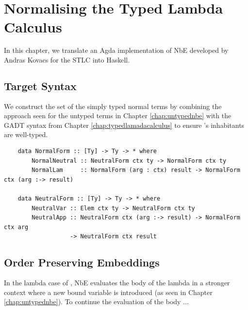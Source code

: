 \chapter{Normalising the Typed Lambda Calculus}
\label{chap:typednbe}

In this chapter, we translate an Agda implementation of NbE developed by Andras Kovacs \cite{AgdaNbe} for the STLC into Haskell.

\section{Target Syntax}


We construct the set of the simply typed normal terms  by combining the approach seen for the untyped terms in Chapter \ref{chap:untypednbe} with the GADT syntax from Chapter \ref{chap:typedlamadacalculus} to ensure 's inhabitants are well-typed.

\begin{lstlisting}
    data NormalForm :: [Ty] -> Ty -> * where
        NormalNeutral :: NeutralForm ctx ty -> NormalForm ctx ty
        NormalLam     :: NormalForm (arg : ctx) result -> NormalForm ctx (arg :-> result)    

    data NeutralForm :: [Ty] -> Ty -> * where
        NeutralVar :: Elem ctx ty -> NeutralForm ctx ty
        NeutralApp :: NeutralForm ctx (arg :-> result) -> NormalForm ctx arg 
                   -> NeutralForm ctx result

\end{lstlisting}






\section{Order Preserving Embeddings}

In the lambda case of , NbE evaluates the body of the lambda in a stronger context where a new bound variable is introduced (as seen in Chapter \ref{chap:untypednbe}). To continue the evaluation of the body ...

